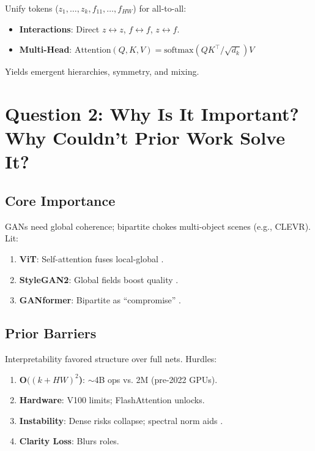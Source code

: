 \documentclass[12pt,a4paper]{article}
\begin{document}
Unify tokens ($z_1, \dots, z_k, f_{11}, \dots, f_{HW}$) for all-to-all:
\begin{itemize}
    \item \textbf{Interactions}: Direct $z \leftrightarrow z$, $f \leftrightarrow f$, $z \leftrightarrow f$.
    \item \textbf{Multi-Head}: $\text{Attention}(Q,K,V)=\text{softmax}(QK^\top/\sqrt{d_k})V$
\end{itemize}

Yields emergent hierarchies, symmetry, and mixing.

\section{Question 2: Why Is It Important? Why Couldn't Prior Work Solve It?}

\subsection{Core Importance}

GANs need global coherence; bipartite chokes multi-object scenes (e.g., CLEVR). Lit:
\begin{enumerate}
    \item \textbf{ViT}: Self-attention fuses local-global \citep{dosovitskiy2021}.
    \item \textbf{StyleGAN2}: Global fields boost quality \citep{karras2019}.
    \item \textbf{GANformer}: Bipartite as ``compromise'' \citep{hudson2021}.
\end{enumerate}

\subsection{Prior Barriers}

Interpretability favored structure over full nets. Hurdles:
\begin{enumerate}
    \item \textbf{O$((k+HW)^2$)}: $\sim$4B ops vs. 2M (pre-2022 GPUs).
    \item \textbf{Hardware}: V100 limits; FlashAttention \citep{dao2022} unlocks.
    \item \textbf{Instability}: Dense risks collapse; spectral norm aids \citep{miyato2018}.
    \item \textbf{Clarity Loss}: Blurs roles.
\end{enumerate}
\end{document}
